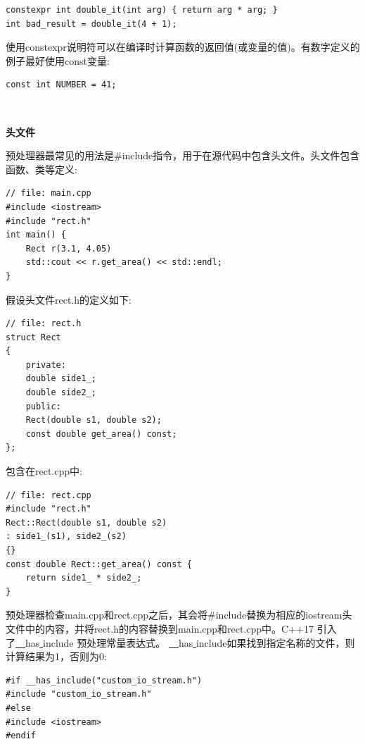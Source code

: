 \begin{lstlisting}[caption={}]
constexpr int double_it(int arg) { return arg * arg; }
int bad_result = double_it(4 + 1);
\end{lstlisting}

使用constexpr说明符可以在编译时计算函数的返回值(或变量的值)。有数字定义的例子最好使用const变量: \par

\begin{lstlisting}[caption={}]
const int NUMBER = 41;
\end{lstlisting}

\noindent\textbf{}\ \par
\textbf{头文件}\ \par
预处理器最常见的用法是\#include指令，用于在源代码中包含头文件。头文件包含函数、类等定义: \par

\begin{lstlisting}[caption={}]
// file: main.cpp
#include <iostream>
#include "rect.h"
int main() {
	Rect r(3.1, 4.05)
	std::cout << r.get_area() << std::endl;
}
\end{lstlisting}

假设头文件rect.h的定义如下: \par

\begin{lstlisting}[caption={}]
// file: rect.h
struct Rect
{
	private:
	double side1_;
	double side2_;
	public:
	Rect(double s1, double s2);
	const double get_area() const;
};
\end{lstlisting}

包含在rect.cpp中: \par

\begin{lstlisting}[caption={}]
// file: rect.cpp
#include "rect.h"
Rect::Rect(double s1, double s2)
: side1_(s1), side2_(s2)
{}
const double Rect::get_area() const {
	return side1_ * side2_;
}
\end{lstlisting}

预处理器检查main.cpp和rect.cpp之后，其会将\#include替换为相应的iostream头文件中的内容，并将rect.h的内容替换到main.cpp和rect.cpp中。C++17 引入了\underline{~~}has\underline{ }include 预处理常量表达式。 \underline{~~}has\underline{ }include如果找到指定名称的文件，则计算结果为1，否则为0: \par

\begin{lstlisting}[caption={}]
#if __has_include("custom_io_stream.h")
#include "custom_io_stream.h"
#else
#include <iostream>
#endif
\end{lstlisting}

